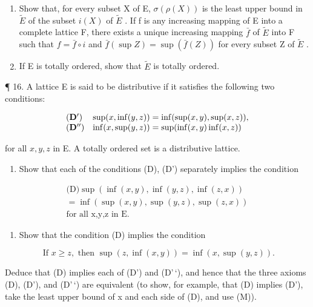\begin{enumerate}
\def\labelenumi{(\alph{enumi})}
\setcounter{enumi}{1}
\item
  Show that, for every subset X of E, \(\sigma(\rho(X))\) is the least upper bound in \(\tilde{E}\) of the subset \(i(X)\) of \(\tilde{E}\) . If f is any increasing mapping of E into a complete lattice F, there exists a unique increasing mapping \(\bar{f}\) of \(\tilde{E}\) into F such that \(f = \bar{f} \circ i\) and \(\bar{f}(\sup Z) = \sup (\bar{f}(Z))\) for every subset Z of \(\tilde{E}\) .
\item
  If E is totally ordered, show that \(\tilde{E}\) is totally ordered.
\end{enumerate}

¶ 16. A lattice E is said to be distributive if it satisfies the following two conditions:

\[
\begin{array}{l l} \left(\mathbf {D} ^ {\prime}\right) & \sup (x, \inf (y, z)) = \inf (\sup (x, y), \sup (x, z)), \\ \left(\mathbf {D} ^ {\prime \prime}\right) & \inf (x, \sup (y, z)) = \sup (\inf (x, y) \inf (x, z)) \end{array}
\]

for all \(x, y, z\) in E. A totally ordered set is a distributive lattice.

\begin{enumerate}
\def\labelenumi{(\alph{enumi})}
\tightlist
\item
  Show that each of the conditions (D), (D') separately implies the condition
\end{enumerate}

\[
\begin{array}{l} \text {(D)} \sup (\inf (x, y), \inf (y, z), \inf (z, x)) \\ = \inf (\sup (x, y), \sup (y, z), \sup (z, x)) \\ \text {for all x,y,z in E.} \end{array}
\]

\begin{enumerate}
\def\labelenumi{(\alph{enumi})}
\setcounter{enumi}{1}
\tightlist
\item
  Show that the condition (D) implies the condition
\end{enumerate}

\[
\text {   If   } x \geqslant z, \text {   then   } \sup (z, \inf (x, y)) = \inf (x, \sup (y, z)).\tag{M}
\]

Deduce that (D) implies each of (D') and (D'\,`), and hence that the three axioms (D), (D'), and (D'\,`) are equivalent (to show, for example, that (D) implies (D'), take the least upper bound of x and each side of (D), and use (M)).


